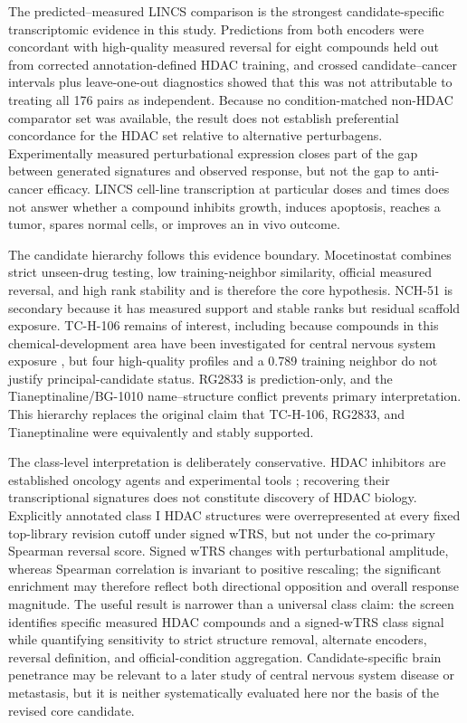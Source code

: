 \begin{roundtworevision}
The predicted--measured LINCS comparison is the strongest candidate-specific transcriptomic evidence in this study. Predictions from both encoders were concordant with high-quality measured reversal for eight compounds held out from corrected annotation-defined HDAC training, and crossed candidate--cancer intervals plus leave-one-out diagnostics showed that this was not attributable to treating all 176 pairs as independent. Because no condition-matched non-HDAC comparator set was available, the result does not establish preferential concordance for the HDAC set relative to alternative perturbagens. Experimentally measured perturbational expression closes part of the gap between generated signatures and observed response, but not the gap to anti-cancer efficacy. LINCS cell-line transcription at particular doses and times does not answer whether a compound inhibits growth, induces apoptosis, reaches a tumor, spares normal cells, or improves an in vivo outcome.
\end{roundtworevision}

The candidate hierarchy follows this evidence boundary. Mocetinostat combines strict unseen-drug testing, low training-neighbor similarity, official measured reversal, and high rank stability and is therefore the core hypothesis. NCH-51 is secondary because it has measured support and stable ranks but residual scaffold exposure. TC-H-106 remains of interest, including because compounds in this chemical-development area have been investigated for central nervous system exposure \cite{mcclure2018}, but four high-quality profiles and a 0.789 training neighbor do not justify principal-candidate status. RG2833 is prediction-only, and the Tianeptinaline/BG-1010 name--structure conflict prevents primary interpretation. This hierarchy replaces the original claim that TC-H-106, RG2833, and Tianeptinaline were equivalently and stably supported.

\begin{roundtworevision}
The class-level interpretation is deliberately conservative. HDAC inhibitors are established oncology agents and experimental tools \cite{johnstone2002,bolden2006,bradner2010}; recovering their transcriptional signatures does not constitute discovery of HDAC biology. Explicitly annotated class I HDAC structures were overrepresented at every fixed top-library revision cutoff under signed wTRS, but not under the co-primary Spearman reversal score. Signed wTRS changes with perturbational amplitude, whereas Spearman correlation is invariant to positive rescaling; the significant enrichment may therefore reflect both directional opposition and overall response magnitude. The useful result is narrower than a universal class claim: the screen identifies specific measured HDAC compounds and a signed-wTRS class signal while quantifying sensitivity to strict structure removal, alternate encoders, reversal definition, and official-condition aggregation. Candidate-specific brain penetrance may be relevant to a later study of central nervous system disease or metastasis, but it is neither systematically evaluated here nor the basis of the revised core candidate.
\end{roundtworevision}

